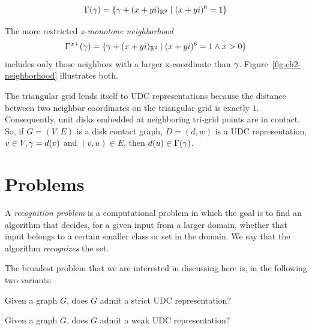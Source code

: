 \begin{align*}
\Gamma(\gamma) = \{ \gamma + (x + yi)_{\mathbb R^2} \mid (x + yi)^6 = 1 \}
\end{align*}

The more restricted \emph{x-monotone neighborhood}
\begin{align*}\Gamma^{x+}(\gamma) = \{ \gamma + (x + yi)_{\mathbb R^2} \mid (x + yi)^6 = 1 \wedge x > 0 \}
\end{align*}
includes only those neighbors with a larger x-coordinate than $\gamma$. Figure~\ref{fig:ch2-neighborhood} illustrates both.

The triangular grid lends itself to UDC representations because the distance between two neighbor coordinates on the triangular grid is exactly $1$. Consequently, unit disks embedded at neighboring tri-grid points are in contact. So, if $G = (V, E)$ is a disk contact graph, $D = (d, w)$ is a UDC representation, $v \in V, \gamma = d(v)$ and $(v, u) \in E$, then $d(u) \in \Gamma(\gamma)$.

\section{Problems}
\label{section:ch2-problems}

A \emph{recognition problem} is a computational problem in which the goal is to find an algorithm that decides, for a given input from a larger domain, whether that input belongs to a certain smaller class or set in the domain. We say that the algorithm \emph{recognizes} the set.

The broadest problem that we are interested in discussing here is, in the following two variants:

\begin{problem}
Given a graph $G$, does $G$ admit a strict UDC representation?
\label{prob:strict-udc}
\end{problem}

\begin{problem}
Given a graph $G$, does $G$ admit a weak UDC representation?
\label{prob:weak-udc}
\end{problem}

